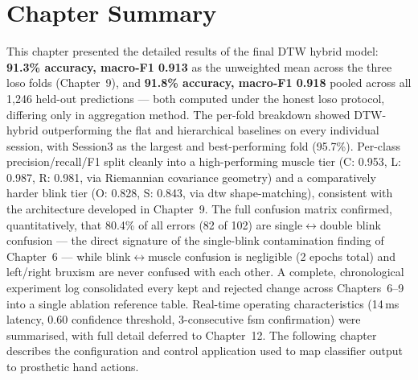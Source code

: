 \section{Chapter Summary}
\label{sec:res_summary}

This chapter presented the detailed results of the final DTW
hybrid model: \textbf{91.3\% accuracy, macro-F1 0.913} as the
unweighted mean across the three \acrshort{loso} folds (Chapter~9),
and \textbf{91.8\% accuracy, macro-F1 0.918} pooled across all
1{,}246 held-out predictions --- both computed under the honest
\acrshort{loso} protocol, differing only in aggregation method.
The per-fold breakdown showed DTW-hybrid outperforming the flat
and hierarchical baselines on every individual session, with
Session3 as the largest and best-performing fold (95.7\%).
Per-class precision/recall/F1 split cleanly into a high-performing
muscle tier (C: 0.953, L: 0.987, R: 0.981, via Riemannian
covariance geometry) and a comparatively harder blink tier (O:
0.828, S: 0.843, via \acrshort{dtw} shape-matching), consistent
with the architecture developed in Chapter~9. The full confusion
matrix confirmed, quantitatively, that 80.4\% of all errors
(82 of 102) are single$\leftrightarrow$double blink confusion ---
the direct signature of the single-blink contamination finding of
Chapter~6 --- while blink$\leftrightarrow$muscle confusion is
negligible (2 epochs total) and left/right bruxism are never
confused with each other. A complete, chronological experiment log
consolidated every kept and rejected change across Chapters~6--9
into a single ablation reference table. Real-time operating
characteristics (14\,ms latency, 0.60 confidence threshold,
3-consecutive \acrshort{fsm} confirmation) were summarised, with
full detail deferred to Chapter~12. The following chapter describes
the configuration and control application used to map classifier
output to prosthetic hand actions.